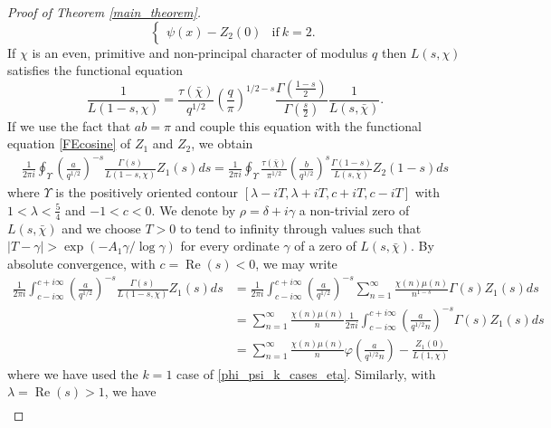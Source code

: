 \documentclass[11pt]{article}
\numberwithin{equation}{section}		 			%
\numberwithin{figure}{section}			 			%
\begin{document}
\begin{proof}[Proof of Theorem \eqref{main_theorem}]
\begin{equation}
\begin{cases}
{\psi (x) - Z_2 (0)} & \mathrm{if\ } k=2. 
			\end{cases}
\end{equation}
If $\chi$ is an even, primitive and non-principal character of modulus $q$ then $L(s,\chi)$ satisfies the functional equation
\[
\frac{1}{{L(1 - s,\chi )}} = \frac{{\tau (\bar \chi )}}{{q^{1/2} }}\left( {\frac{q}{\pi }} \right)^{1/2 - s} \frac{{\Gamma (\tfrac{{1 - s}}{2})}}{{\Gamma (\tfrac{s}{2})}}\frac{1}{{L(s,\bar \chi )}}.
\]
If we use the fact that $ab = \pi$ and couple this equation with the functional equation \eqref{FEcosine} of $Z_1$ and $Z_2$, we obtain
\begin{align} \label{FE_contour_integrals}
\frac{1}
{{2\pi i}}\oint_\Upsilon  {\left( {\frac{a}
{{q^{ 1/2} }}} \right)^{ - s} \frac{{\Gamma (s)}}
{{L(1 - s,\chi )}}Z_1 (s)ds}  = \frac{1}
{{2\pi i}}\oint_\Upsilon  {\frac{{\tau (\bar \chi )}}
{{\pi ^{1/2} }}\left( {\frac{b}
{{q^{1/2} }}} \right)^s \frac{{\Gamma (1 - s)}}
{{L(s,\bar \chi )}}Z_2 (1 - s)ds} 
\end{align}
where $\Upsilon$ is the positively oriented contour $[\lambda - iT, \lambda + iT, c+iT, c-iT]$ with $1< \lambda < \tfrac{5}{4}$ and $-1 < c < 0$. We denote by $\rho = \delta + i \gamma$ a non-trivial zero of $L(s,\bar \chi)$ and we choose $T>0$ to tend to infinity through values such that $|T - \gamma| > \exp(-A_1 \gamma / \log \gamma)$ for every ordinate $\gamma$ of a zero of $L(s,\bar \chi)$. By absolute convergence, with $c= \operatorname{Re}(s) < 0$, we may write
\begin{align}
  \frac{1}
{{2\pi i}}\int_{c - i\infty }^{c + i\infty } {\left( {\frac{a}
{{q^{1/2} }}} \right)^{ - s} \frac{{\Gamma (s)}}
{{L(1 - s,\chi )}}Z_1 (s)ds}  &= \frac{1}
{{2\pi i}}\int_{c - i\infty }^{c + i\infty } {\left( {\frac{a}
{{q^{1/2} }}} \right)^{ - s} \sum\limits_{n = 1}^\infty  {\frac{{\chi (n)\mu (n)}}
{{n^{1 - s} }}} \Gamma (s)Z_1 (s)ds}  \nonumber \\
   &= \sum\limits_{n = 1}^\infty  {\frac{{\chi (n)\mu (n)}}
{n}\frac{1}
{{2\pi i}}\int_{c - i\infty }^{c + i\infty } {\left( {\frac{a}
{{q^{1/2} n}}} \right)^{ - s} \Gamma (s)Z_1 (s)ds} }  \nonumber \\
   &= \sum\limits_{n = 1}^\infty  {\frac{{\chi (n)\mu (n)}}
{n}\varphi \left( {\frac{a}
{{q^{1/2} n}}} \right)}  - \frac{{Z_1 (0)}}
{{L(1,\chi )}} \nonumber 
\end{align}
where we have used the $k=1$ case of \eqref{phi_psi_k_cases_eta}. Similarly, with $\lambda = \operatorname{Re}(s) > 1$, we have
\begin{align}

\end{align}
\end{proof}
\end{document}
